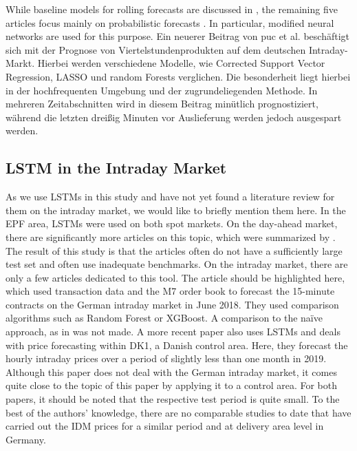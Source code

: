 \documentclass[preprint,12pt,nonatbib]{elsarticle}
\begin{document}
While baseline models for rolling forecasts are discussed in \cite{Hornek.2024}, the remaining five articles focus mainly on probabilistic forecasts \cite{Marcjasz.2023, Marcjasz.2023b, Hirsch.2024, Hirsch.2024b, Nickelsen.2024}.
In particular, modified neural networks are used for this purpose.
Ein neuerer Beitrag von puc et al. \cite{puć2024} beschäftigt sich mit der Prognose von Viertelstundenprodukten auf dem deutschen Intraday-Markt.
Hierbei werden verschiedene Modelle, wie Corrected Support Vector Regression, LASSO und random Forests verglichen.
Die besonderheit liegt hierbei in der hochfrequenten Umgebung und der zugrundeliegenden Methode. 
In mehreren Zeitabschnitten wird in diesem Beitrag minütlich prognostiziert, während die letzten dreißig Minuten vor Auslieferung werden jedoch ausgespart werden.

\subsection{LSTM in the Intraday Market}
As we use LSTMs in this study and have not yet found a literature review for them on the intraday market, we would like to briefly mention them here. In the EPF area, LSTMs were used on both spot markets.
On the day-ahead market, there are significantly more articles on this topic, which were summarized by \cite{Lago.2018b}.
The result of this study is that the articles often do not have a sufficiently large test set and often use inadequate benchmarks. On the intraday market, there are only a few articles dedicated to this tool.
The article \cite{Scholz.2021} should be highlighted here, which used transaction data and the M7 order book to forecast the 15-minute contracts on the German intraday market in June 2018.
They used comparison algorithms such as Random Forest or XGBoost. A comparison to the naïve approach, as in \cite{Marcjasz.2020,Narajewski.2020} was not made.
A more recent paper \cite{Klc.2024} also uses LSTMs and deals with price forecasting within DK1, a Danish control area. 
Here, they forecast the hourly intraday prices over a period of slightly less than one month in 2019.
Although this paper does not deal with the German intraday market, it comes quite close to the topic of this paper by applying it to a control area.
For both papers, it should be noted that the respective test period is quite small.
To the best of the authors' knowledge, there are no comparable studies to date that have carried out the IDM prices for a similar period and at delivery area level in Germany.
\end{document}

